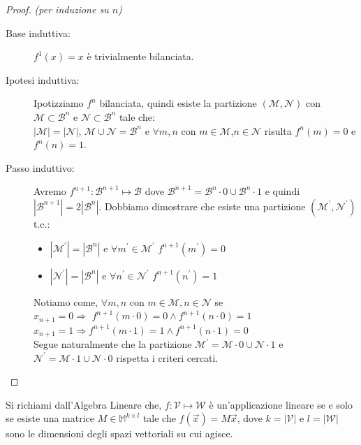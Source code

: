 \documentclass[12pt,a4paper,openright]{report}
\begin{document}
\begin{proof}
    \textit{(per induzione su $n$)\\}
    \begin{description}
        \item[Base induttiva:] $f^1(x)=x$ è trivialmente bilanciata.
        \item[Ipotesi induttiva:] Ipotizziamo $f^n$ bilanciata, quindi esiste la partizione $(\mathcal{M},\mathcal{N})$ con $\mathcal{M}\subset\mathcal{B}^n$ e $\mathcal{N}\subset\mathcal{B}^n$ tale che:\\
                                      ${\left\vert{\mathcal{M}}\right\vert} = {\left\vert{\mathcal{N}}\right\vert}$, $\mathcal{M} \cup \mathcal{N} = \mathcal{B}^n$ e $\forall m,n$ con
                                      $m\in\mathcal{M}$,$n \in\mathcal{N}$ risulta $f^n(m) = 0$ e $ f^n(n) = 1$.
        \item[Passo induttivo:] Avremo $f^{n+1}:\mathcal{B}^{n+1}\mapsto\mathcal{B}$ dove  $\mathcal{B}^{n+1} = \mathcal{B}^n\cdot0 \cup \mathcal{B}^n\cdot1$ e quindi\\
                                     $\left\vert\mathcal{B}^{n+1}\right\vert = 2\left\vert\mathcal{B}^{n}\right\vert$. Dobbiamo dimostrare che esiste una partizione
                                     $(\mathcal{M^\prime},\mathcal{N^\prime})$ t.c.:
                                     \begin{itemize}
                                        \item $\left\vert\mathcal{M^\prime}\right\vert=\left\vert\mathcal{B}^{n}\right\vert$ e $\forall m^\prime \in \mathcal{M^\prime}$ $f^{n+1}(m^\prime) = 0$ 
                                        \item $\left\vert\mathcal{N^\prime}\right\vert=\left\vert\mathcal{B}^{n}\right\vert$ e $\forall n^\prime \in \mathcal{N^\prime}$ $f^{n+1}(n^\prime) = 1$   
                                      \end{itemize}
                                      Notiamo come, $\forall m,n$ con $ m\in\mathcal{M},n\in\mathcal{N}$ se\\
                                      $x_{n+1} = 0 \Rightarrow $ $f^{n+1}(m\cdot0)=0 \land f^{n+1}(n\cdot0)=1$\\
                                      $x_{n+1} = 1 \Rightarrow $$f^{n+1}(m\cdot1)=1 \land f^{n+1}(n\cdot1)=0$\\
                                      Segue naturalmente che la partizione $\mathcal{M^\prime} = \mathcal{M}\cdot0 \cup \mathcal{N}\cdot1$ e $\mathcal{N^\prime} = \mathcal{M}\cdot1 \cup \mathcal{N}\cdot0$
                                      rispetta i criteri cercati. 
    \end{description}      
\end{proof}
\par
Si richiami dall'Algebra Lineare che, $f:\mathcal{V}\mapsto\mathcal{W}$ è un'applicazione lineare se e solo se esiste una matrice $M \in \mathbb{M}^{k \times l}$ tale che $f(\vec{x})=M\vec{x}$, dove $k = \left\vert\mathcal{V}\right\vert$ e $l = \left\vert\mathcal{W}\right\vert$ sono le dimensioni degli spazi vettoriali su cui agisce.\\
\end{document}
